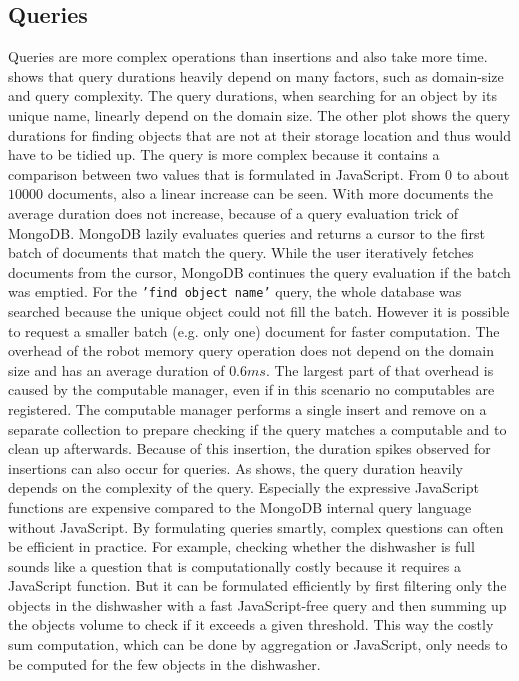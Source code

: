 \subsection{Queries}
\label{sec:queries}
Queries are more complex operations than insertions and also take more
time.  shows that query durations heavily
depend on many factors, such as domain-size and query complexity. The
query durations, when searching for an object by its unique name,
linearly depend on the domain size. The other plot shows the query
durations for finding objects that are not at their storage location
and thus would have to be tidied up. The query is more complex
because it contains a comparison between two values that is formulated
in JavaScript. From $0$ to about $10000$ documents, also a linear
increase can be seen. With more documents the average duration does
not increase, because of a query evaluation trick of MongoDB. MongoDB
lazily evaluates queries and returns a cursor to the first batch of
documents that match the query. While the user iteratively fetches
documents from the cursor, MongoDB continues the query evaluation if
the batch was emptied. For the \texttt{'find object name'} query, the whole
database was searched because the unique object could not fill the
batch. However it is possible to request a smaller batch (e.g. only
one) document for faster computation.   The overhead of the robot memory query operation does not
depend on the domain size and has an average duration of $0.6ms$. The
largest part of that overhead is caused by the computable manager,
even if in this scenario no computables are registered. The computable
manager performs a single insert and remove on a separate collection
to prepare checking if the query matches a computable and to clean up
afterwards. Because of this insertion, the duration spikes observed
for insertions can also occur for queries. As 
shows, the query duration heavily depends on the complexity of the
query. Especially the expressive JavaScript functions are expensive
compared to the MongoDB internal query language without JavaScript. By
formulating queries smartly, complex questions can often be
efficient in practice. For example, checking whether the dishwasher
is full sounds like a question that is computationally costly because
it requires a JavaScript function. But it can be formulated efficiently
by first filtering only the objects in the dishwasher with a fast
JavaScript-free query and then summing up the objects volume to check
if it exceeds a given threshold. This way the costly sum computation,
which can be done by aggregation or JavaScript, only needs to be
computed for the few objects in the dishwasher.

